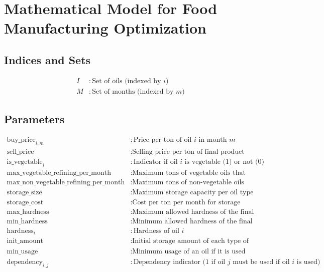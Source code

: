 \documentclass{article}
\begin{document}
\section*{Mathematical Model for Food Manufacturing Optimization}

\subsection*{Indices and Sets}
\begin{align*}
I & : \text{Set of oils (indexed by $i$)} \\
M & : \text{Set of months (indexed by $m$)}
\end{align*}

\subsection*{Parameters}
\begin{align*}
\text{buy\_price}_{i,m} & : \text{Price per ton of oil $i$ in month $m$} \\
\text{sell\_price} & : \text{Selling price per ton of final product} \\
\text{is\_vegetable}_i & : \text{Indicator if oil $i$ is vegetable (1) or not (0)} \\
\text{max\_vegetable\_refining\_per\_month} & : \text{Maximum tons of vegetable oils that can be refined per month} \\
\text{max\_non\_vegetable\_refining\_per\_month} & : \text{Maximum tons of non-vegetable oils that can be refined per month} \\
\text{storage\_size} & : \text{Maximum storage capacity per oil type (tons)} \\
\text{storage\_cost} & : \text{Cost per ton per month for storage} \\
\text{max\_hardness} & : \text{Maximum allowed hardness of the final product} \\
\text{min\_hardness} & : \text{Minimum allowed hardness of the final product} \\
\text{hardness}_i & : \text{Hardness of oil $i$} \\
\text{init\_amount} & : \text{Initial storage amount of each type of oil (tons)} \\
\text{min\_usage} & : \text{Minimum usage of an oil if it is used (tons)} \\
\text{dependency}_{i,j} & : \text{Dependency indicator (1 if oil $j$ must be used if oil $i$ is used)}
\end{align*}
\end{document}
